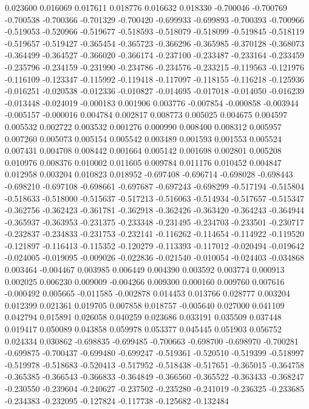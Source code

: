 0.023600
0.016069
0.017611
0.018776
0.016632
0.018330
-0.700046
-0.700769
-0.700538
-0.700366
-0.701329
-0.700420
-0.699933
-0.699893
-0.700393
-0.700966
-0.519053
-0.520966
-0.519677
-0.518593
-0.518079
-0.518099
-0.519845
-0.518119
-0.519657
-0.519427
-0.365454
-0.365723
-0.366296
-0.365985
-0.370128
-0.368073
-0.364499
-0.364527
-0.366020
-0.366174
-0.237100
-0.233487
-0.233164
-0.233459
-0.235796
-0.234159
-0.231990
-0.234786
-0.234576
-0.233215
-0.119563
-0.121976
-0.116109
-0.123347
-0.115992
-0.119418
-0.117097
-0.118155
-0.116218
-0.125936
-0.016251
-0.020538
-0.012336
-0.010827
-0.014695
-0.017018
-0.014050
-0.016239
-0.013448
-0.024019
-0.000183
0.001906
0.003776
-0.007854
-0.000858
-0.003944
-0.005157
-0.000016
0.004784
0.002817
0.008773
0.005025
0.004675
0.004597
0.005532
0.002722
0.003532
0.001276
0.000990
0.008400
0.008312
0.005957
0.007260
0.005073
0.005154
0.005542
0.003489
0.001593
0.001553
0.005524
0.007431
0.004708
0.008442
0.001664
0.005142
0.001698
0.002801
0.005208
0.010976
0.008376
0.010002
0.011605
0.009784
0.011176
0.010452
0.004847
0.012958
0.003204
0.010823
0.018952
-0.697408
-0.696714
-0.698028
-0.698443
-0.698210
-0.697108
-0.698661
-0.697687
-0.697243
-0.698299
-0.517194
-0.515804
-0.518633
-0.518000
-0.515637
-0.517213
-0.516063
-0.514934
-0.517657
-0.515347
-0.362756
-0.362423
-0.361781
-0.362918
-0.362426
-0.363420
-0.364243
-0.364944
-0.365937
-0.363953
-0.231375
-0.233348
-0.231495
-0.234703
-0.233501
-0.230717
-0.232837
-0.234833
-0.231753
-0.232141
-0.116262
-0.114654
-0.114922
-0.119520
-0.121897
-0.116413
-0.115352
-0.120279
-0.113393
-0.117012
-0.020494
-0.019642
-0.024005
-0.019095
-0.009026
-0.022836
-0.021540
-0.010054
-0.024403
-0.034868
0.003464
-0.004467
0.003985
0.006449
0.004390
0.003592
0.003774
0.000913
0.002025
0.006230
0.009009
-0.004266
0.009300
0.000160
0.009760
0.007616
-0.000492
0.005665
-0.011585
-0.002878
0.014453
0.013766
0.028777
0.003204
0.012399
0.021361
0.019705
0.007858
0.018757
-0.005640
0.027000
0.041109
0.042794
0.015891
0.026058
0.040259
0.023686
0.033191
0.035509
0.037448
0.019417
0.050089
0.043858
0.059978
0.053377
0.045445
0.051903
0.056752
0.024334
0.030862
-0.698835
-0.699485
-0.700663
-0.698700
-0.698970
-0.700281
-0.699875
-0.700437
-0.699480
-0.699247
-0.519361
-0.520510
-0.519399
-0.518997
-0.519978
-0.518683
-0.520413
-0.517952
-0.518438
-0.517651
-0.365015
-0.364758
-0.365385
-0.366543
-0.366833
-0.364849
-0.366560
-0.365522
-0.363433
-0.368247
-0.230550
-0.239604
-0.240627
-0.237502
-0.235280
-0.241019
-0.236325
-0.233685
-0.234383
-0.232095
-0.127824
-0.117738
-0.125682
-0.132484
